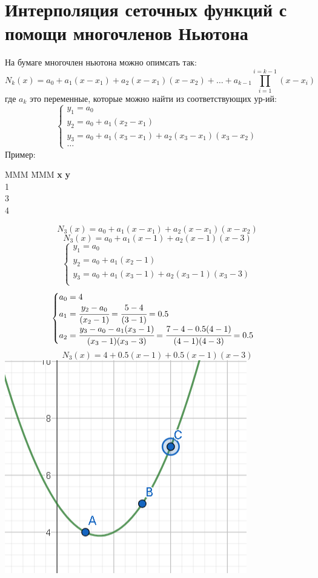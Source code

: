 \documentclass[12pt]{article} %
\begin{document}
 		\section{Интерполяция сеточных функций с помощи многочленов Ньютона}
 		На бумаге многочлен ньютона можно опимсать так:
 		\[N_k(x) = a_0 + a_1(x-x_1) + a_2(x-x_1)(x-x_2) + \dots + a_{k-1} \prod_{i=1}^{i=k-1}(x - x_i)\]
 		где $a_k$ это переменные, которые можно найти из соответствующих ур-ий:
 		\[ \begin{cases}
 			y_1 = a_0\\
 			y_2 = a_0 + a_1(x_2-x_1)\\
 			y_3 = a_0 + a_1(x_3-x_1) + a_2(x_3-x_1)(x_3-x_2)\\
 			\dots
 		\end{cases}\]
 		Пример:
 		\begin{tabbing}
 			MMM \= MMM \kill
 		\textbf{x} \> \textbf{y}\\
 			1 \\
 			3  \\
 			4  \\
		\end{tabbing}
		\[ N_3(x) = a_0 + a_1(x-x_1) + a_2(x-x_1)(x-x_2)  \]
		\[N_3(x) = a_0 + a_1(x-1) + a_2(x-1)(x-3)\]
		\[ \begin{cases}
			y_1 = a_0\\
			y_2 = a_0 + a_1(x_2-1)\\
			y_3 = a_0 + a_1(x_3-1) + a_2(x_3-1)(x_3-3)\\
		\end{cases} \]
		\[ \begin{cases}
			a_0 = 4\\
			a_1 = \cfrac{y_2-a_0}{(x_2-1)} = \cfrac{5-4}{(3-1)} = 0.5\\
			a_2 = \cfrac{y_3 - a_0 - a_1(x_3-1)}{(x_3-1)(x_3-3)} = \cfrac{7 - 4 - 0.5(4-1)}{(4-1)(4-3)} = 0.5 \\
		\end{cases} \]
		\[N_3(x) = 4 + 0.5(x-1) + 0.5(x-1)(x-3)\]
		\includegraphics{3}
\end{document}
